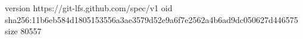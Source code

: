 version https://git-lfs.github.com/spec/v1
oid sha256:11b6eb584d1805153556a3ae3579d52e9a6f7e2562a4b6ad9dc050627d446575
size 80557
